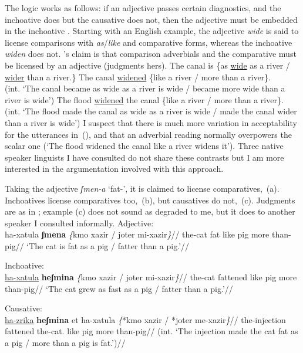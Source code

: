 The logic works as follows: if an adjective passes certain diagnostics, and the inchoative does but the causative does not, then the adjective must be embedded in the inchoative \citep[130]{borer91}. Starting with an English example, the adjective \emph{wide} is said to license comparisons with \emph{as}/\emph{like} and comparative forms, whereas the inchoative \emph{widen} does not. \citeauthor{borer91}'s claim is that comparison adverbials and the comparative must be licensed by an adjective (judgments hers).
\pex
  \a The canal is \{as \underline{wide} as a river / \underline{wider} than a river.\}
  \a The canal \underline{widened} \{like a river / more than a river\}.\\
	  (int. `The canal became as wide as a river is wide / became more wide than a river is wide')
  \a \ljudge{*} The flood \underline{widened} the canal \{like a river / more than a river\}.\\
	  (int. `The flood made the canal as wide as a river is wide / made the canal wider than a river is wide')
\xe
I suspect that there is much more variation in acceptability for the utterances in~(\lastx), and that an adverbial reading normally overpowers the scalar one (`The flood widened the canal like a river widens it'). Three native speaker linguists I have consulted do not share these contrasts but I am more interested in the argumentation involved with this approach.

Taking the adjective \emph{ʃmen-a} `fat-', it is claimed to license comparatives,~(\nextx a). Inchoatives license comparatives too,~(\nextx b), but causatives do not,~(\nextx c). Judgments are as in \cite{borer91}; example (\nextx c) does not sound as degraded to me, but it does to another speaker I consulted informally.
\pex
  \a Adjective:\\ \begingl
    \gla ha-xatula \textbf{ʃmena} \emph{\{}kmo xazir / joter mi-xazir\emph{\}}//
    \glb the-cat fat like pig {} more than-pig//
    \glft `The cat is fat as a pig / fatter than a pig.'//
  \endgl
  
  \a Inchoative:\\ \begingl
    \gla \underline{ha-xatula} \textbf{heʃmina} \emph{\{}kmo xazir / joter mi-xazir\emph{\}}//
    \glb the-cat fattened like pig {} more than-pig//
    \glft `The cat grew as fast as a pig / fatter than a pig.'//
  \endgl

  \a Causative:\\ \begingl
    \gla \ljudge{*}\underline{ha-zrika} \textbf{heʃmina} et ha-xatula \emph{\{}*kmo xazir / *joter me-xazir\emph{\}}//
    \glb the-injection fattened  the-cat. like pig {} more than-pig//
    \glft (int. `The injection made the cat fat as a pig / more than a pig is fat.')//
  \endgl
\xe

